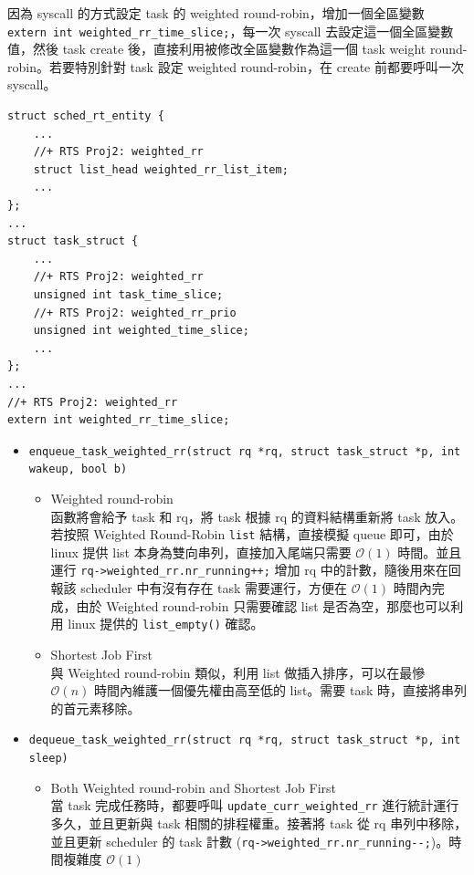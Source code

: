 \documentclass{res}
\begin{document}
\begin{resume}
因為 syscall 的方式設定 task 的 weighted round-robin，增加一個全區變數 \lstinline{extern int weighted_rr_time_slice;}，每一次 syscall 去設定這一個全區變數值，然後 task create 後，直接利用被修改全區變數作為這一個 task weight round-robin。若要特別針對 task 設定 weighted round-robin，在 create 前都要呼叫一次 syscall。

\begin{lstlisting}[frame=single]
struct sched_rt_entity {
    ...
    //+ RTS Proj2: weighted_rr
    struct list_head weighted_rr_list_item;
    ...
};
...
struct task_struct {
    ...
    //+ RTS Proj2: weighted_rr
    unsigned int task_time_slice;
    //+ RTS Proj2: weighted_rr_prio
    unsigned int weighted_time_slice;
    ...
};
...
//+ RTS Proj2: weighted_rr
extern int weighted_rr_time_slice;
\end{lstlisting}

\vspace*{.1in} 

\begin{itemize}
	\item	
	\lstinline{enqueue_task_weighted_rr(struct rq *rq, struct task_struct *p, int wakeup, bool b)}
	\begin{itemize}
		\item Weighted round-robin \\
	函數將會給予 task 和 rq，將 task 根據 rq 的資料結構重新將 task 放入。若按照 Weighted Round-Robin \lstinline{list} 結構，直接模擬 queue 即可，由於 linux 提供 list 本身為雙向串列，直接加入尾端只需要 $\mathcal{O}(1)$ 時間。並且運行 \lstinline{rq->weighted_rr.nr_running++;} 增加 rq 中的計數，隨後用來在回報該 scheduler 中有沒有存在 task 需要運行，方便在 $\mathcal{O}(1)$ 時間內完成，由於 Weighted round-robin 只需要確認 list 是否為空，那麼也可以利用 linux 提供的 \lstinline{list_empty()} 確認。
		\item Shortest Job First \\
		與 Weighted round-robin 類似，利用 list 做插入排序，可以在最慘 $\mathcal{O}(n)$ 時間內維護一個優先權由高至低的 list。需要 task 時，直接將串列的首元素移除。
	\end{itemize}
	
	\item
	\lstinline{dequeue_task_weighted_rr(struct rq *rq, struct task_struct *p, int sleep)} \\
	\begin{itemize}
		\item Both Weighted round-robin and Shortest Job First \\
		當 task 完成任務時，都要呼叫 \lstinline{update_curr_weighted_rr} 進行統計運行多久，並且更新與 task 相關的排程權重。接著將 task 從 rq 串列中移除，並且更新 scheduler 的 task 計數 (\lstinline{rq->weighted_rr.nr_running--;})。時間複雜度 $\mathcal{O}(1)$
	\end{itemize}
	

\end{itemize}
\end{resume}
\end{document}
